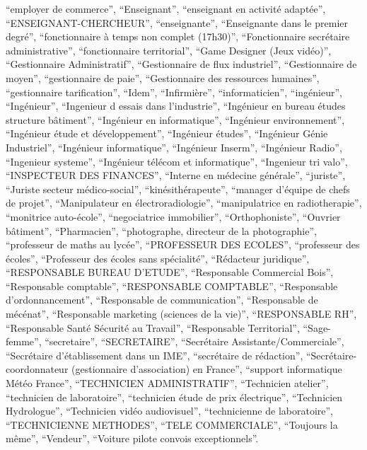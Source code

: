 \documentclass[
  letterpaper,
  DIV=11,
  numbers=noendperiod]{scrartcl}
\begin{document}
\begin{itemize}
  ``employer de commerce'', ``Enseignant'', ``enseignant en activité
  adaptée'', ``ENSEIGNANT-CHERCHEUR'', ``enseignante'', ``Enseignante
  dans le premier degré'', ``fonctionnaire à temps non complet
  (17h30)'', ``Fonctionnaire secrétaire administrative'',
  ``fonctionnaire territorial'', ``Game Designer (Jeux vidéo)'',
  ``Gestionnaire Administratif'', ``Gestionnaire de flux industriel'',
  ``Gestionnaire de moyen'', ``gestionnaire de paie'', ``Gestionnaire
  des ressources humaines'', ``gestionnaire tarification'', ``Idem'',
  ``Infirmière'', ``informaticien'', ``ingénieur'', ``Ingénieur'',
  ``Ingenieur d essais dans l'industrie'', ``Ingénieur en bureau études
  structure bâtiment'', ``Ingénieur en informatique'', ``Ingénieur
  environnement'', ``Ingénieur étude et développement'', ``Ingénieur
  études'', ``Ingénieur Génie Industriel'', ``Ingénieur informatique'',
  ``Ingénieur Inserm'', ``Ingénieur Radio'', ``Ingenieur systeme'',
  ``Ingénieur télécom et informatique'', ``Ingenieur tri valo'',
  ``INSPECTEUR DES FINANCES'', ``Interne en médecine générale'',
  ``juriste'', ``Juriste secteur médico-social'', ``kinésithérapeute'',
  ``manager d'équipe de chefs de projet'', ``Manipulateur en
  électroradiologie'', ``manipulatrice en radiotherapie'', ``monitrice
  auto-école'', ``negociatrice immobilier'', ``Orthophoniste'',
  ``Ouvrier bâtiment'', ``Pharmacien'', ``photographe, directeur de la
  photographie'', ``professeur de maths au lycée'', ``PROFESSEUR DES
  ECOLES'', ``professeur des écoles'', ``Professeur des écoles sans
  spécialité'', ``Rédacteur juridique'', ``RESPONSABLE BUREAU D'ETUDE'',
  ``Responsable Commercial Bois'', ``Responsable comptable'',
  ``RESPONSABLE COMPTABLE'', ``Responsable d'ordonnancement'',
  ``Responsable de communication'', ``Responsable de mécénat'',
  ``Responsable marketing (sciences de la vie)'', ``RESPONSABLE RH'',
  ``Responsable Santé Sécurité au Travail'', ``Responsable
  Territorial'', ``Sage-femme'', ``secretaire'', ``SECRETAIRE'',
  ``Secrétaire Assistante/Commerciale'', ``Secrétaire d'établissement
  dans un IME'', ``secrétaire de rédaction'', ``Secrétaire-coordonnateur
  (gestionnaire d'association) en France'', ``support informatique Météo
  France'', ``TECHNICIEN ADMINISTRATIF'', ``Technicien atelier'',
  ``technicien de laboratoire'', ``technicien étude de prix
  électrique'', ``Technicien Hydrologue'', ``Technicien vidéo
  audiovisuel'', ``technicienne de laboratoire'', ``TECHNICIENNE
  METHODES'', ``TELE COMMERCIALE'', ``Toujours la même'', ``Vendeur'',
  ``Voiture pilote convois exceptionnels''.
\end{itemize}
\end{document}
